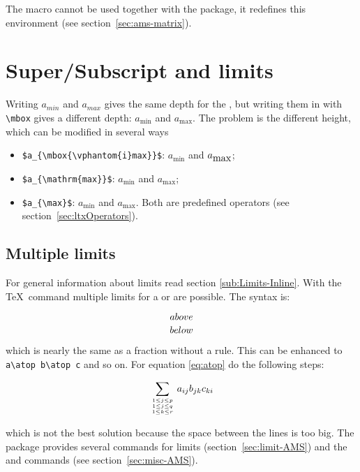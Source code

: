 The  macro cannot be used together with the \AmSmath package, it redefines
this environment (see section~\vref{sec:ams-matrix}). 

\section{Super/Subscript and limits}\label{sec:limits}
Writing $a_{min}$ and $a_{max}$ gives the same depth for the , but
writing them in  with \verb+\mbox+ gives a different 
depth: $a_{\mbox{min}}$ and $a_{\mbox{max}}$.
The problem is the different height, which can be modified in several ways
\begin{itemize}
\item  \verb+$a_{\mbox{\vphantom{i}max}}$+: $a_{\mbox{min}}$ and $a_{\mbox{\vphantom{i}max}}$;
\item \verb+$a_{\mathrm{max}}$+: $a_{\mathrm{min}}$ and $a_{\mathrm{max}}$;
\item \verb+$a_{\max}$+: $a_{\min}$ and $a_{\max}$. Both are predefined 
    operators (see section~\vref{sec:ltxOperators}).
\end{itemize}

\subsection{Multiple limits}\label{sub:Multiple-Limits}

%
For general information about limits read section
\vref{sub:Limits-Inline}. With the \TeX\ command  
multiple limits for a  or  are possible. The syntax is:

\begin{LTXexample}[width=0.4\linewidth]
\[ {above \atop below} \]
\end{LTXexample}

\noindent which is nearly the same as a fraction without a rule. This can
be enhanced to \verb|a\atop b\atop c| and so on. For equation \ref{eq:atop} do the following steps:

\begin{LTXexample}[width=0.4\linewidth]
\begin{equation}\label{eq:atop}
\sum_{{1\le j\le p\atop {%
  {1\le j\le q\atop 1\le k\le r}}}%
}a_{ij}b_{jk}c_{ki}
\end{equation}
\end{LTXexample}


\bigskip
{}%
which is not the best solution because the space between the lines
is too big. 
The \AmSmath package provides several commands for 
limits (section~\vref{sec:limit-AMS}) and the  and  
commands (see section~\vref{sec:misc-AMS}).

